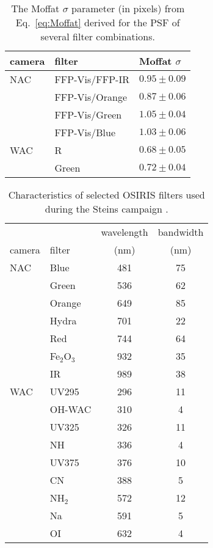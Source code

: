 \documentclass[preprint,3p,authoryear]{elsarticle}
\begin{document}





\newpage
\clearpage

\begin{table}
\centering
\caption{The Moffat $\sigma$ parameter (in pixels) from Eq.~\ref{eq:Moffat} derived for the PSF of several filter combinations.}
\vspace{5mm}
\begin{tabular}{|lll|}
\hline
\hline
camera & filter & Moffat $\sigma$ \\
\hline
NAC & FFP-Vis/FFP-IR & $0.95 \pm 0.09$ \\
    & FFP-Vis/Orange & $0.87 \pm 0.06$ \\
    & FFP-Vis/Green  & $1.05 \pm 0.04$ \\
    & FFP-Vis/Blue   & $1.03 \pm 0.06$ \\
WAC & R              & $0.68 \pm 0.05$ \\
    & Green          & $0.72 \pm 0.04$ \\
\hline
\hline
\end{tabular}
\label{tab:psf}
\end{table}

\begin{table}
\centering
\caption{Characteristics of selected OSIRIS filters used during the Steins campaign \citep{K07}.}
\vspace{5mm}
\begin{tabular}{|llcc|}
\hline
\hline
       &        & wavelength & bandwidth \\
camera & filter & (nm) & (nm) \\
\hline
NAC & Blue        & 481 & 75 \\
    & Green       & 536 & 62 \\
    & Orange      & 649 & 85 \\
    & Hydra       & 701 & 22 \\
    & Red         & 744 & 64 \\
    & Fe$_2$O$_3$ & 932 & 35 \\
    & IR          & 989 & 38 \\
WAC & UV295       & 296 & 11 \\
    & OH-WAC      & 310 &  4 \\
    & UV325       & 326 & 11 \\
    & NH          & 336 &  4 \\
    & UV375       & 376 & 10 \\
    & CN          & 388 &  5 \\
    & NH$_2$      & 572 & 12 \\
    & Na          & 591 &  5 \\
    & OI          & 632 &  4 \\
\hline
\hline
\end{tabular}
\label{tab:filters}
\end{table}
\end{document}
